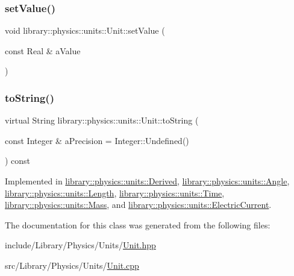 \mbox{\label{classlibrary_1_1physics_1_1units_1_1_unit_a0d61125a36ae706eb4800564fb7c5e54}} 
\subsubsection{\texorpdfstring{set\+Value()}{setValue()}}
{\footnotesize\ttfamily void library\+::physics\+::units\+::\+Unit\+::set\+Value (\begin{DoxyParamCaption}\item[{const Real \&}]{a\+Value }\end{DoxyParamCaption})}

\mbox{\label{classlibrary_1_1physics_1_1units_1_1_unit_ad7364d457300e36413323c4aebce8029}} 
\subsubsection{\texorpdfstring{to\+String()}{toString()}}
{\footnotesize\ttfamily virtual String library\+::physics\+::units\+::\+Unit\+::to\+String (\begin{DoxyParamCaption}\item[{const Integer \&}]{a\+Precision = {\ttfamily Integer\+:\+:Undefined()} }\end{DoxyParamCaption}) const\hspace{0.3cm}{\ttfamily [pure virtual]}}



Implemented in \hyperlink{classlibrary_1_1physics_1_1units_1_1_derived_a3626d6c77e6753f44232067856fde9d1}{library\+::physics\+::units\+::\+Derived}, \hyperlink{classlibrary_1_1physics_1_1units_1_1_angle_aae6b7bd4e028ea7719f5a712ca19a86c}{library\+::physics\+::units\+::\+Angle}, \hyperlink{classlibrary_1_1physics_1_1units_1_1_length_aea1d96e6930f7e6e6383e78c55219a64}{library\+::physics\+::units\+::\+Length}, \hyperlink{classlibrary_1_1physics_1_1units_1_1_time_a6f56977493a45d334bb53bc4246888c4}{library\+::physics\+::units\+::\+Time}, \hyperlink{classlibrary_1_1physics_1_1units_1_1_mass_a6e7757920752ac9f6918525d6fadb31e}{library\+::physics\+::units\+::\+Mass}, and \hyperlink{classlibrary_1_1physics_1_1units_1_1_electric_current_ab2325214012e6f50350a0dec575d877f}{library\+::physics\+::units\+::\+Electric\+Current}.



The documentation for this class was generated from the following files\+:\begin{DoxyCompactItemize}
\item 
include/\+Library/\+Physics/\+Units/\hyperlink{_units_2_unit_8hpp}{Unit.\+hpp}\item 
src/\+Library/\+Physics/\+Units/\hyperlink{_units_2_unit_8cpp}{Unit.\+cpp}\end{DoxyCompactItemize}
